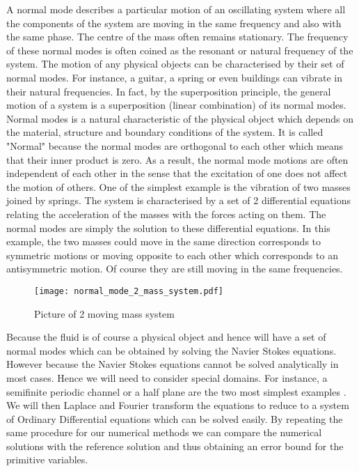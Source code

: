 A normal mode describes a particular motion of an oscillating system where all the components of the system are moving in the same frequency and also with the same phase. The centre of the mass often remains stationary. The frequency of these normal modes is often coined as the resonant or natural frequency of the system. The motion of any physical objects can be characterised by their set of normal modes. For instance, a guitar, a spring or even buildings can vibrate in their natural frequencies. In fact, by the superposition principle, the general motion of a system is a superposition (linear combination) of its normal modes. Normal modes is a natural characteristic of the physical object which depends on the material, structure and boundary conditions of the system. It is called "Normal" because the normal modes are orthogonal to each other which means that their inner product is zero. As a result, the normal mode motions are often independent of each other in the sense that the excitation of one does not affect the motion of others. One of the simplest example is the vibration of two masses joined by springs. The system is characterised by a set of 2 differential equations relating the acceleration of the masses with the forces acting on them. The normal modes are simply the solution to these differential equations. In this example, the two masses could move in the same direction corresponds to symmetric motions or moving opposite to each other which corresponds to an antisymmetric motion. Of course they are still moving in the same frequencies.\\

\begin{figure}[H]
	\centering
	\texttt{[image: normal\_mode\_2\_mass\_system.pdf]}
	\caption{Picture of 2 moving mass system}\label{fig:5.1}
\end{figure}
Because the fluid is of course a physical object and hence will have a set of normal modes which can be obtained by solving the Navier Stokes equations. However because the Navier Stokes equations cannot be solved analytically in most cases. Hence we will need to consider special domains. For instance, a semifinite periodic channel or a half plane are the two most simplest examples \cite{strikwerda1999accuracy}. We will then Laplace and Fourier transform the equations to reduce to a system of Ordinary Differential equations which can be solved easily. By repeating the same procedure for our numerical methods we can compare the numerical solutions with the reference solution and thus obtaining an error bound for the primitive variables.

